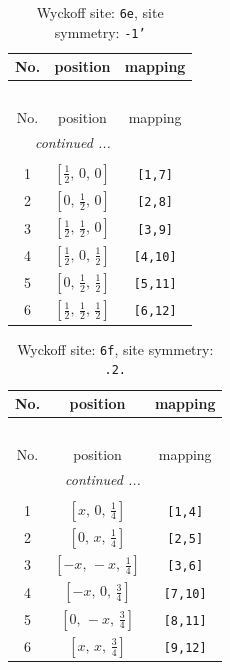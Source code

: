 \documentclass[fleqn,8pt]{jsarticle}
\begin{document}
\renewcommand{\arraystretch}{1.2}
\begin{longtable}{ccc}
\caption{Wyckoff site: {\tt 6e}, site symmetry: {\tt -1'}}
 \\
 \hline \hline
No. & position & mapping \\ \hline \endfirsthead

\multicolumn{2}{l}{\tablename\ \thetable{}} \\
 \hline \hline
No. & position & mapping \\ \hline \endhead

 \hline \hline
\multicolumn{2}{r}{\footnotesize\it continued ...} \\ \endfoot

 \hline \hline
\multicolumn{2}{r}{} \\ \endlastfoot

1 & $\left[ \frac{1}{2},\, 0,\, 0 \right]$ & {\tt [1,7]} \\ \hline
2 & $\left[ 0,\, \frac{1}{2},\, 0 \right]$ & {\tt [2,8]} \\ \hline
3 & $\left[ \frac{1}{2},\, \frac{1}{2},\, 0 \right]$ & {\tt [3,9]} \\ \hline
4 & $\left[ \frac{1}{2},\, 0,\, \frac{1}{2} \right]$ & {\tt [4,10]} \\ \hline
5 & $\left[ 0,\, \frac{1}{2},\, \frac{1}{2} \right]$ & {\tt [5,11]} \\ \hline
6 & $\left[ \frac{1}{2},\, \frac{1}{2},\, \frac{1}{2} \right]$ & {\tt [6,12]} \\
\end{longtable}
\renewcommand{\arraystretch}{1.2}
\begin{longtable}{ccc}
\caption{Wyckoff site: {\tt 6f}, site symmetry: {\tt .2.}}
 \\
 \hline \hline
No. & position & mapping \\ \hline \endfirsthead

\multicolumn{2}{l}{\tablename\ \thetable{}} \\
 \hline \hline
No. & position & mapping \\ \hline \endhead

 \hline \hline
\multicolumn{2}{r}{\footnotesize\it continued ...} \\ \endfoot

 \hline \hline
\multicolumn{2}{r}{} \\ \endlastfoot

1 & $\left[ x,\, 0,\, \frac{1}{4} \right]$ & {\tt [1,4]} \\ \hline
2 & $\left[ 0,\, x,\, \frac{1}{4} \right]$ & {\tt [2,5]} \\ \hline
3 & $\left[ - x,\, - x,\, \frac{1}{4} \right]$ & {\tt [3,6]} \\ \hline
4 & $\left[ - x,\, 0,\, \frac{3}{4} \right]$ & {\tt [7,10]} \\ \hline
5 & $\left[ 0,\, - x,\, \frac{3}{4} \right]$ & {\tt [8,11]} \\ \hline
6 & $\left[ x,\, x,\, \frac{3}{4} \right]$ & {\tt [9,12]} \\
\end{longtable}
\end{document}
